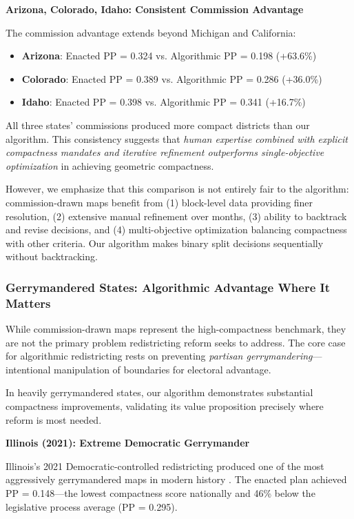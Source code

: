 \textbf{Arizona, Colorado, Idaho: Consistent Commission Advantage}

The commission advantage extends beyond Michigan and California:
\begin{itemize}
\item \textbf{Arizona}: Enacted PP = 0.324 vs. Algorithmic PP = 0.198 (+63.6\%)
\item \textbf{Colorado}: Enacted PP = 0.389 vs. Algorithmic PP = 0.286 (+36.0\%)
\item \textbf{Idaho}: Enacted PP = 0.398 vs. Algorithmic PP = 0.341 (+16.7\%)
\end{itemize}

All three states' commissions produced more compact districts than our algorithm. This consistency suggests that \textit{human expertise combined with explicit compactness mandates and iterative refinement outperforms single-objective optimization} in achieving geometric compactness.

However, we emphasize that this comparison is not entirely fair to the algorithm: commission-drawn maps benefit from (1) block-level data providing finer resolution, (2) extensive manual refinement over months, (3) ability to backtrack and revise decisions, and (4) multi-objective optimization balancing compactness with other criteria. Our algorithm makes binary split decisions sequentially without backtracking.

\subsubsection{Gerrymandered States: Algorithmic Advantage Where It Matters}

While commission-drawn maps represent the high-compactness benchmark, they are not the primary problem redistricting reform seeks to address. The core case for algorithmic redistricting rests on preventing \textit{partisan gerrymandering}—intentional manipulation of boundaries for electoral advantage.

In heavily gerrymandered states, our algorithm demonstrates substantial compactness improvements, validating its value proposition precisely where reform is most needed.

\textbf{Illinois (2021): Extreme Democratic Gerrymander}

Illinois's 2021 Democratic-controlled redistricting produced one of the most aggressively gerrymandered maps in modern history \citep{duchin2022illinois}. The enacted plan achieved PP = 0.148—the lowest compactness score nationally and 46\% below the legislative process average (PP = 0.295).

